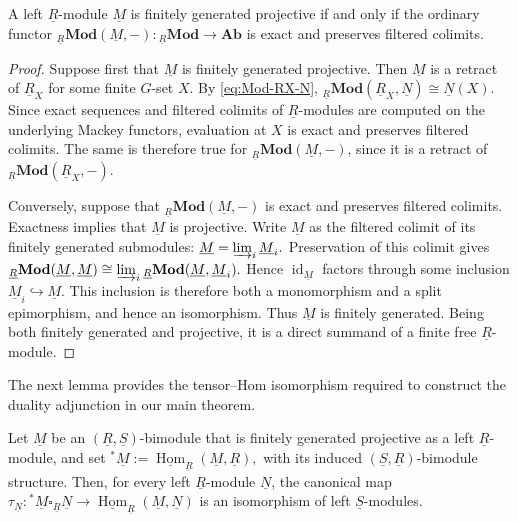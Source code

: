 \documentclass[11pt,oneside]{amsart}
\DeclareMathOperator{\Hom}{Hom}
\DeclareMathOperator{\id}{id}
\numberwithin{equation}{section}
\numberwithin{figure}{section}
\theoremstyle{plain}
\theoremstyle{definition}
\theoremstyle{remark}
\begin{document}
\begin{lemma}\label{lem:fgp-Hom-criterion}
A left \(\underline R\)-module \(\underline M\) is finitely generated
projective if and only if the ordinary functor
\(
{}_{\underline R}\mathbf{Mod}(\underline M,-)
\colon
{}_{\underline R}\mathbf{Mod}\longrightarrow\mathbf{Ab}
\)
is exact and preserves filtered colimits.
\end{lemma}

\begin{proof}
Suppose first that \(\underline M\) is finitely generated projective.
Then \(\underline M\) is a retract of \(\underline R_X\) for some
finite \(G\)-set \(X\).  By \eqref{eq:Mod-RX-N},
\(
{}_{\underline R}\mathbf{Mod}(\underline R_X,\underline N)
\cong
\underline N(X).
\)
Since exact sequences and filtered colimits of
\(\underline R\)-modules are computed on the underlying Mackey
functors, evaluation at \(X\) is exact and preserves filtered
colimits.  The same is therefore true for
\({}_{\underline R}\mathbf{Mod}(\underline M,-)\), since it is a
retract of
\({}_{\underline R}\mathbf{Mod}(\underline R_X,-)\).

Conversely, suppose that
\({}_{\underline R}\mathbf{Mod}(\underline M,-)\) is exact and
preserves filtered colimits.  Exactness implies that
\(\underline M\) is projective.  Write \(\underline M\) as the
filtered colimit of its finitely generated submodules:
\(
\underline M=\varinjlim_i\underline M_i.
\)
Preservation of this colimit gives
\(
{}_{\underline R}\mathbf{Mod}(\underline M,\underline M)
\cong
\varinjlim_i
{}_{\underline R}\mathbf{Mod}(\underline M,\underline M_i).
\)
Hence \(\id_{\underline M}\) factors through some inclusion
\(\underline M_i\hookrightarrow\underline M\).  This inclusion is
therefore both a monomorphism and a split epimorphism, and hence an
isomorphism.  Thus \(\underline M\) is finitely generated.  Being
both finitely generated and projective, it is a direct summand of a
finite free \(\underline R\)-module.
\end{proof}

The next lemma provides the tensor--Hom isomorphism required to construct the duality adjunction in our main theorem.

\begin{lemma}\label{lem:hom-tensor-green}
Let \(\underline M\) be an
\((\underline R,\underline S)\)-bimodule that is finitely generated
projective as a left \(\underline R\)-module, and set
\(
{}^*\underline M
:=
\underline{\Hom}_{\underline R}(\underline M,\underline R),
\)
with its induced \((\underline S,\underline R)\)-bimodule structure.
Then, for every left \(\underline R\)-module \(\underline N\), the
canonical  map
\(
\tau_{\underline N}\colon
{}^*\underline M\square_{\underline R}\underline N
\longrightarrow
\underline{\Hom}_{\underline R}(\underline M,\underline N)
\)
is an isomorphism of left \(\underline S\)-modules.
\end{lemma}
\end{document}
